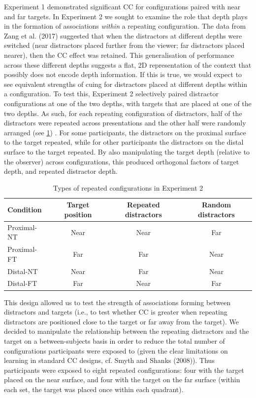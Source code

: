 \documentclass[
  english,
  man,floatsintext]{apa7}
\begin{document}
Experiment 1 demonstrated significant CC for configurations paired with near and far targets. In Experiment 2 we sought to examine the role that depth plays in the formation of associations \emph{within} a repeating configuration. The data from Zang et al. (2017) suggested that when the distractors at different depths were switched (near distractors placed further from the viewer; far distractors placed nearer), then the CC effect was retained. This generalisation of performance across these different depths suggests a flat, 2D representation of the context that possibly does not encode depth information. If this is true, we would expect to see equivalent strengths of cuing for distractors placed at different depths within a configuration. To test this, Experiment 2 selectively paired distractor configurations at one of the two depths, with targets that are placed at one of the two depths. As such, for each repeating configuration of distractors, half of the distractors were repeated across presentations and the other half were randomly arranged (see \ref{tab:Exp-2-design}) . For some participants, the distractors on the proximal surface to the target repeated, while for other participants the distractors on the distal surface to the target repeated. By also manipulating the target depth (relative to the observer) across configurations, this produced orthogonal factors of target depth, and repeated distractor depth.

\begin{table}

\caption{\label{tab:Exp-2-design}Types of repeated configurations in Experiment 2}
\centering
\begin{tabular}[t]{lccc}
\toprule
Condition & Target position & Repeated distractors & Random distractors\\
\midrule
Proximal-NT & Near & Near & Far\\
Proximal-FT & Far & Far & Near\\
Distal-NT & Near & Far & Near\\
Distal-FT & Far & Near & Far\\
\bottomrule
\end{tabular}
\end{table}

This design allowed us to test the strength of associations forming between distractors and targets (i.e., to test whether CC is greater when repeating distractors are positioned close to the target or far away from the target). We decided to manipulate the relationship between the repeating distractors and the target on a between-subjects basis in order to reduce the total number of configurations participants were exposed to (given the clear limitations on learning in standard CC designs, cf. Smyth and Shanks (2008)). Thus participants were exposed to eight repeated configurations: four with the target placed on the near surface, and four with the target on the far surface (within each set, the target was placed once within each quadrant).
\end{document}
